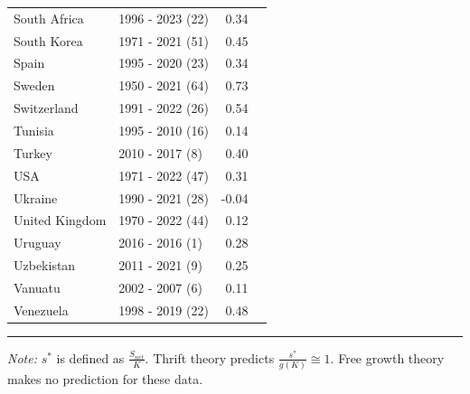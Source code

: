 \begin{table}[pos=h]
{{\begin{tabular}{llrr}
South Africa & 1996 - 2023 (22) & 0.34\\
South Korea & 1971 - 2021 (51) & 0.45\\
Spain & 1995 - 2020 (23) & 0.34\\
\addlinespace
Sweden & 1950 - 2021 (64) & 0.73\\
Switzerland & 1991 - 2022 (26) & 0.54\\
Tunisia & 1995 - 2010 (16) & 0.14\\
Turkey & 2010 - 2017 (8) & 0.40\\
USA & 1971 - 2022 (47) & 0.31\\
\addlinespace
Ukraine & 1990 - 2021 (28) & -0.04\\
United Kingdom & 1970 - 2022 (44) & 0.12\\
Uruguay & 2016 - 2016 (1) & 0.28\\
Uzbekistan & 2011 - 2021 (9) & 0.25\\
Vanuatu & 2002 - 2007 (6) & 0.11\\
\addlinespace
Venezuela & 1998 - 2019 (22) & 0.48\\ \end{tabular}

}
}
\hrule
\begin{flushleft}
\footnotesize \emph{Note:} \(s^*\) is defined as \(\frac{S_{net}}{K}\). Thrift theory predicts \(\frac{s^*}{g(K)} \cong 1\). Free growth theory makes no prediction for these data.
\end{flushleft}
\end{table}